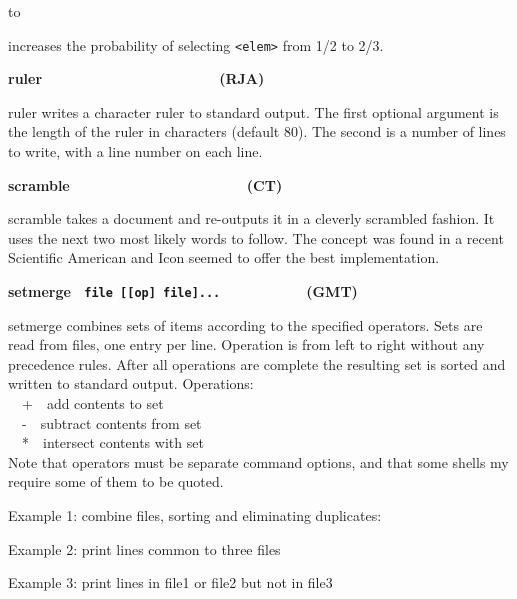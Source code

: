 to


increases the probability of selecting
\texttt{{\textless}elem{\textgreater}} from 1/2 to 2/3. 

{\sffamily\bfseries
ruler\ \ \ \ \ \ \ \ \ \ \ \ \ \ \ \ \ \ \ \ \ \ (RJA)}

\textsf{ruler} writes a character ruler to standard output. The first
optional argument is the length of the ruler in characters (default
80). The second is a number of lines to write, with a line number on
each line.

{\sffamily\bfseries
scramble\ \ \ \ \ \ \ \ \ \ \ \ \ \ \ \ \ \ \ \  \ \ (CT)}

\textsf{scramble} takes a document and re-outputs it in a cleverly
scrambled fashion. It uses the next two most likely words to follow.
The concept was found in a recent Scientific American and Icon seemed
to offer the best implementation.

{\sffamily\bfseries
setmerge \ \texttt{\textmd{file [[op]
file]...\ \ \ \ \ \ \ \ \ \ \ \ }}(GMT)}

\textsf{setmerge} combines sets of items according to the specified
operators. Sets are read from files, one entry per line. Operation is
from left to right without any precedence rules. After all operations
are complete the resulting set is sorted and written to standard
output. Operations:\\
\ \ +\ \ add contents to set\\
\ \ {}-\ \ subtract contents from set\\
\ \ *\ \ intersect contents with set\\
Note that operators must be separate command options, and that some
shells my require some of them to be quoted.

Example 1: combine files, sorting and eliminating duplicates:


Example 2: print lines common to three files


Example 3: print lines in file1 or file2 but not in file3


